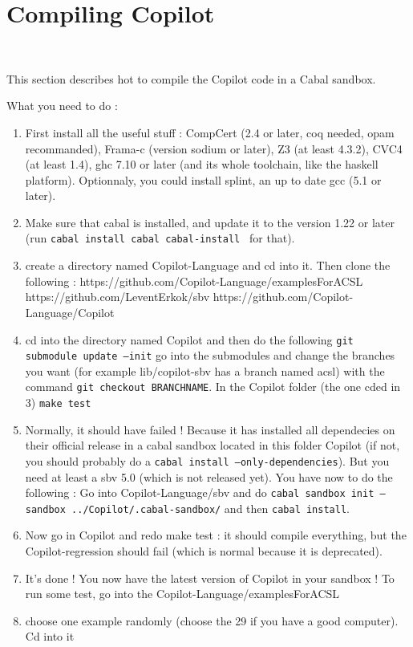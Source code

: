 \section{Compiling Copilot}~\label{sec:compile}

This section describes hot to compile the Copilot code in a Cabal sandbox.

What you need to do : 
\begin{enumerate}
\item First install all the useful stuff : CompCert (2.4 or later, coq needed, opam recommanded), Frama-c (version sodium or later), Z3 (at least 4.3.2), CVC4 (at least 1.4), ghc 7.10 or later (and its whole toolchain, like the haskell platform).
\subitem Optionnaly, you could install splint, an up to date gcc (5.1 or later).
\item Make sure that cabal is installed, and update it to the version 1.22 or later (run \texttt{cabal install cabal cabal-install } for that). 
\item create a directory named Copilot-Language and cd into it. Then clone the following :
\subitem https://github.com/Copilot-Language/examplesForACSL
\subitem https://github.com/LeventErkok/sbv
\subitem https://github.com/Copilot-Language/Copilot
\item cd into the directory named Copilot and then do the following
\subitem \texttt{git submodule update --init}
\subitem go into the submodules and change the branches you want (for example lib/copilot-sbv has a branch named acsl) with the command \texttt{git checkout BRANCHNAME}. 
\subitem In the Copilot folder (the one cded in 3) \texttt{make test}
\item Normally, it should have failed ! Because it has installed all dependecies on their official release in a cabal sandbox located in this folder Copilot (if not, you should probably do a \texttt{cabal install --only-dependencies}). But you need at least a sbv 5.0 (which is not released yet). You have now to do the following :
\subitem Go into Copilot-Language/sbv and do \texttt{cabal sandbox init --sandbox ../Copilot/.cabal-sandbox/} and then \texttt{cabal install}.
\item Now go in Copilot and redo make test : it should compile everything, but the Copilot-regression should fail (which is normal because it is deprecated).
\item It's done ! You now have the latest version of Copilot in your sandbox ! To run some test, go into the Copilot-Language/examplesForACSL
\item choose one example randomly (choose the 29 if you have a good computer). Cd into it

\end{enumerate}
